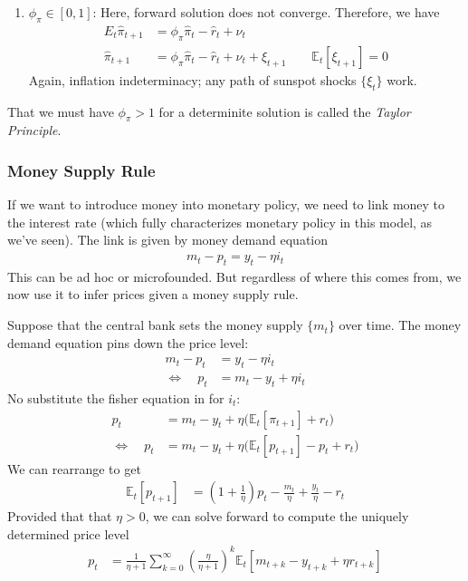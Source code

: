 \documentclass[12pt]{article}
\theoremstyle{plain}
\theoremstyle{definition}
\theoremstyle{remark}
\newcommand{\E}{\mathbb{E}}
\begin{document}
\begin{enumerate}[label=(\roman*)]
  \item $\phi_\pi\in[0,1]$: Here, forward solution does not
    converge. Therefore, we have
    \begin{align*}
      E_t\hat{\pi}_{t+1}
      &= \phi_\pi\hat{\pi}_t - \hat{r}_t + \nu_t \\
      \hat{\pi}_{t+1}
      &= \phi_\pi\hat{\pi}_t - \hat{r}_t + \nu_t + \xi_{t+1}
      \qquad\E_t[\xi_{t+1}]=0
    \end{align*}
    Again, inflation indeterminacy; any path of sunspot shocks
    $\{\xi_t\}$ work.
\end{enumerate}
That we must have $\phi_\pi>1$ for a determinite solution is called
the \emph{Taylor Principle}.

\clearpage
\subsubsection{Money Supply Rule}

If we want to introduce money into monetary policy, we need to link
money to the interest rate (which fully characterizes monetary policy in
this model, as we've seen). The link is given by money demand equation
\begin{align*}
  m_t - p_t = y_t - \eta i_t
\end{align*}
This can be ad hoc or microfounded. But regardless of where this comes
from, we now use it to infer prices given a money supply rule.

Suppose that the central bank sets the money supply $\{m_t\}$ over time.
The money demand equation pins down the price level:
\begin{align*}
  m_t - p_t &= y_t - \eta i_t \\
  \iff\quad
  p_t
  &=
  m_t - y_t + \eta i_t
\end{align*}
No substitute the fisher equation in for $i_t$:
\begin{align*}
  p_t &=
  m_t
  - y_t
  + \eta \big(\E_t[\pi_{t+1}] + r_t\big)
  \\
  \iff\quad
  p_t
  &=
  m_t
  - y_t
  + \eta \big(\E_t[p_{t+1}] - p_t + r_t\big)
\end{align*}
We can rearrange to get
\begin{align*}
  \E_t[p_{t+1}]
  &=
  \left(
  1+
  \frac{1}{\eta}
  \right)p_t
  -
  \frac{m_t}{\eta}
  + \frac{y_t}{\eta}
  - r_t
\end{align*}
Provided that that $\eta>0$, we can solve forward to compute the
uniquely determined price level
\begin{align*}
  p_t
  &=
  \frac{1}{\eta + 1}
  \sum_{k=0}^\infty
  \left(\frac{\eta}{\eta + 1} \right)^k
  \E_t\left[
    m_{t+k}
  - y_{t+k}
  + \eta r_{t+k}
  \right]
\end{align*}
\end{document}
